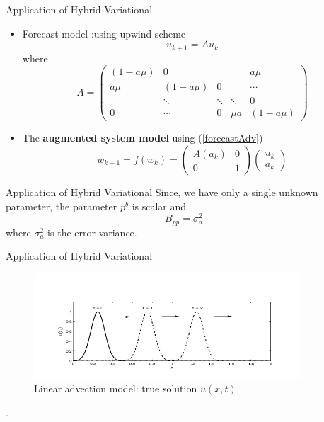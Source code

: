 \documentclass{beamer}
\begin{document}
\begin{frame}{Application of Hybrid Variational}
\begin{itemize}
    \item Forecast model :using upwind scheme
            \begin{equation}
            u_{k+1} = A  u_k 
            \label{forecastAdv}
            \end{equation}
            where 
            \[A = 
            \begin{pmatrix}
            (1-a\mu)  & 0&   &  &a\mu \\
             a\mu  & (1-a\mu) & 0&  &\cdots \\
             &\ddots & \ddots &\ddots & 0 \\
             0 & \cdots & 0 & \mu a & (1-a\mu)
            \end{pmatrix}
            \]
    \item The \textbf{augmented system model} using (\ref{forecastAdv})
            \begin{equation}
            w_{k+1} = f(w_k) = 
            \begin{pmatrix}
            A(a_k) & 0\\
            0 & 1
            \end{pmatrix} 
            \begin{pmatrix}
            u_k\\
            a_k
            \end{pmatrix} 
            \label{MatrixA}
            \end{equation}
\end{itemize}
\end{frame}
\begin{frame}{Application of Hybrid Variational}
    Since, we have only a single unknown parameter, the parameter $p^b$ is scalar and 
    \begin{equation}
        B_{pp} = \sigma_a^2
    \label{Bpp}
    \end{equation}
    where $\sigma_a^2$ is the error variance.
\end{frame}
\begin{frame}{Application of Hybrid Variational}
\begin{figure}[h]
    \begin{center}
    \includegraphics[width=10cm]{./Image/trueSolAdvection.png}
    \caption{Linear advection model: true solution $u(x, t)$}
    \label{trueSol}
    \end{center}
\end{figure}.
\end{frame}
\end{document}
